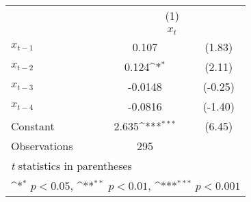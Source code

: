 {
\def\sym#1{\ifmmode^{#1}\else\(^{#1}\)\fi}
\begin{tabular}{l*{1}{cc}}
\toprule
                    &\multicolumn{2}{c}{(1)}           \\
                    &\multicolumn{2}{c}{$ x_t$}        \\
\midrule
$ x_{t-1}$          &       0.107         &      (1.83)\\
$ x_{t-2}$          &       0.124\sym{*}  &      (2.11)\\
$ x_{t-3}$          &     -0.0148         &     (-0.25)\\
$ x_{t-4}$          &     -0.0816         &     (-1.40)\\
Constant            &       2.635\sym{***}&      (6.45)\\
\midrule
Observations        &         295         &            \\
\bottomrule
\multicolumn{3}{l}{\footnotesize \textit{t} statistics in parentheses}\\
\multicolumn{3}{l}{\footnotesize \sym{*} \(p<0.05\), \sym{**} \(p<0.01\), \sym{***} \(p<0.001\)}\\
\end{tabular}
}
